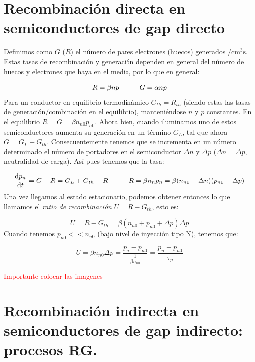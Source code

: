 \section{Recombinación directa en semiconductores de gap directo}

Definimos como $G$ ($R$) el número de pares electrones (huecos) generados $/\mathrm{cm}^3\mathrm{s}$. Estas tasas de recombinación y generación dependen en general del número de huecos y electrones que haya en el medio, por lo que en general:

\begin{equation}
	R = \beta np \quad \quad \quad G = \alpha np
\end{equation} 
Para un conductor en equilibrio termodinámico $G_{th}=R_{th}$ (siendo estas las tasas de generación/combinación en el equilibrio), manteniéndose $n$ y $p$ constantes. En el equilibrio  $R = G = \beta n_{n0}p_{n0}$. Ahora bien, cuando iluminamos uno de estos semiconductores aumenta su generación en un término $G_L$, tal que ahora $G=G_L+G_{th}$. Consecuentemente tenemos que se incrementa en un número determinado el número de portadores en el semiconductor $\Delta n$ y $\Delta p$ ($\Delta n = \Delta p$, neutralidad de carga). Así pues tenemos que la tasa:


\begin{equation}
	\frac{\mathrm{d} p_n}{\mathrm{d} t} = G-R=G_L + G_{th} - R \quad \quad \quad R = \beta n_n p_n = \beta (n_{n0}+\Delta n) (p_{n0}+\Delta p)
\end{equation}
Una vez llegamos al estado estacionario, podemos obtener entonces lo que llamamos el  \textit{ratio de recombinación} $U=R-G_{th}$, esto es:

\begin{equation}
	U = R-G_{th} = \beta (n_{n0}+p_{n0}+\Delta p)\Delta p
\end{equation}
Cuando tenemos $p_{n0}<<n_{n0}$ (bajo nivel de inyección tipo N), tenemos que:

\begin{equation}
	U = \beta n_{n0}\Delta p = \frac{p_n - p_{n0}}{\frac{1}{\beta n_{n0}}} =  \frac{p_n - p_{n0}}{\tau_p}
\end{equation}


\begin{Anotacion}
	\textcolor{red}{Importante colocar las imagenes}
\end{Anotacion}



\section{Recombinación indirecta en semiconductores de gap indirecto: procesos RG.}

